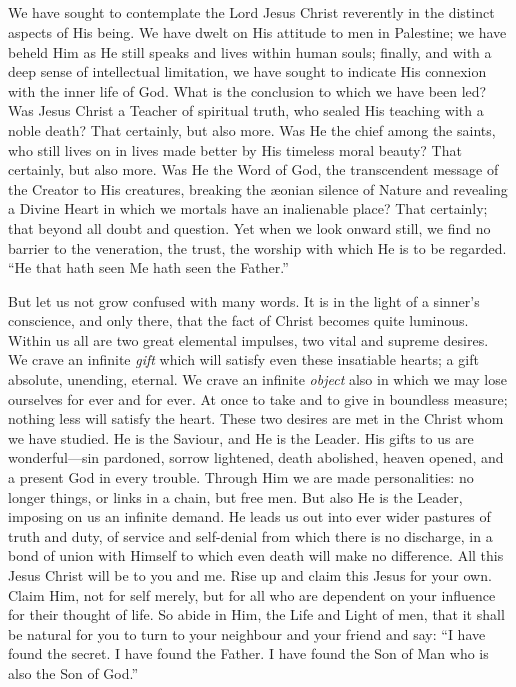 \documentclass[12pt,a5paper,oneside]{book}
\begin{document}
\subsection*{}
We have sought to contemplate the Lord
Jesus Christ reverently in the distinct aspects
of His being. We have dwelt on His attitude
to men in Palestine; we have beheld Him
as He still speaks and lives within human
souls; finally, and with a deep sense of
intellectual limitation, we have sought to
indicate His connexion with the inner life of
God. What is the conclusion to which we
have been led? Was Jesus Christ a Teacher
of spiritual truth, who sealed His teaching
with a noble death? That certainly, but also
more. Was He the chief among the saints,
who still lives on in lives made better by His
timeless moral beauty? That certainly, but
also more. Was He the Word of God, the
transcendent message of the Creator to His
creatures, breaking the {\ae}onian silence of
Nature and revealing a Divine Heart in which
we mortals have an inalienable place? That
certainly; that beyond all doubt and question.
Yet when we look onward still, we find no
barrier to the veneration, the trust, the worship
with which He is to be regarded. ``He that
hath seen Me hath seen the Father.''

But let us not grow confused with many
words. It is in the light of a sinner's conscience, 
and only there, that the fact of Christ
becomes quite luminous. Within us all are
two great elemental impulses, two vital and
supreme desires. We crave an infinite \textit{gift}
which will satisfy even these insatiable hearts;
a gift absolute, unending, eternal. We crave
an infinite \textit{object} also in which we may lose
ourselves for ever and for ever. At once to
take and to give in boundless measure; nothing
less will satisfy the heart. These two desires
are met in the Christ whom we have
studied. He is the Saviour, and He is the
Leader. His gifts to us are wonderful---sin
pardoned, sorrow lightened, death abolished,
heaven opened, and a present God in every
trouble. Through Him we are made personalities: 
no longer things, or links in a chain, but
free men. But also He is the Leader, imposing
on us an infinite demand. He leads us out
into ever wider pastures of truth and duty, of
service and self-denial from which there is no
discharge, in a bond of union with Himself
to which even death will make no difference.
All this Jesus Christ will be to you and
me. Rise up and claim this Jesus for your
own. Claim Him, not for self merely, but
for all who are dependent on your influence
for their thought of life. So abide in Him,
the Life and Light of men, that it shall be
natural for you to turn to your neighbour and
your friend and say: ``I have found the
secret. I have found the Father. I have
found the Son of Man who is also the Son
of God.''


 
\end{document}
